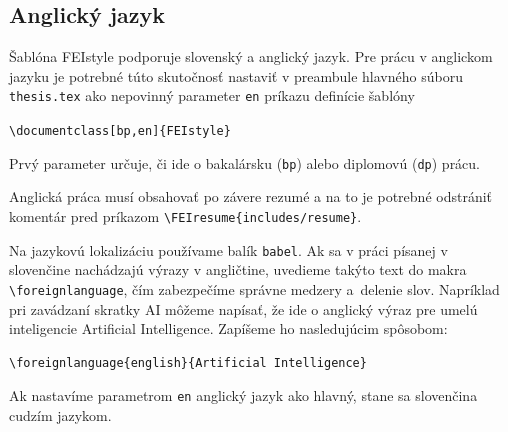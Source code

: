 \documentclass[../../../thesis.tex]{subfiles}
\begin{document}
\subsection{Anglický jazyk}
Šablóna FEIstyle podporuje slovenský a anglický jazyk.
Pre prácu v anglickom jazyku je potrebné túto skutočnosť nastaviť v preambule hlavného súboru \verb|thesis.tex| ako nepovinný parameter \verb|en| príkazu definície šablóny
\begin{trivlist}
\item \texttt{\textbackslash documentclass[bp,en]\{FEIstyle\}}
\end{trivlist}
Prvý parameter určuje, či ide o bakalársku (\verb|bp|) alebo diplomovú (\verb|dp|) prácu.

Anglická práca musí obsahovať po závere rezumé a na to je potrebné odstrániť komentár pred príkazom
\verb|\FEIresume{includes/resume}|.

Na jazykovú lokalizáciu používame balík \verb|babel|.
Ak sa v práci písanej v slovenčine nachádzajú výrazy v angličtine,
uvedieme takýto text do makra \verb|\foreignlanguage|, čím zabezpečíme správne medzery a~delenie slov.
Napríklad pri zavádzaní skratky AI môžeme napísať, že ide o anglický výraz pre umelú inteligencie \foreignlanguage{english}{Artificial Intelligence}.
Zapíšeme ho nasledujúcim spôsobom:
\begin{verbatim}
\foreignlanguage{english}{Artificial Intelligence}
\end{verbatim}

Ak nastavíme parametrom \verb|en| anglický jazyk ako hlavný, stane sa slovenčina cudzím jazykom.
\end{document}
